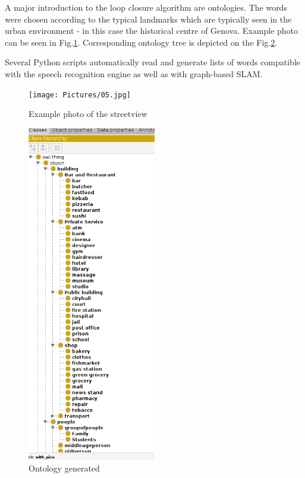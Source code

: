 \documentclass[conference]{IEEEtran}
\begin{document}
A major introduction to the loop closure algorithm are ontologies.
The words were chosen according to the typical landmarks which are typically seen in the urban environment - in this case the historical centre of Genova. Example photo can be seen in Fig.\ref{street view}. Corresponding ontology tree is depicted on the Fig.\ref{onto}.

Several Python scripts automatically read and generate lists of words compatible
with the speech recognition engine as well as with graph-based SLAM.
\begin{figure}[htbp]
    \centerline{\texttt{[image: Pictures/05.jpg]}}
    \caption{Example photo of the streetview}

    \label{street view}

\end{figure}



\begin{figure}[htbp]
    \centerline{\includegraphics[width=0.5\textwidth,height=0.2\textheight,keepaspectratio]{Pictures/onto.png}}
    \caption{Ontology generated}

    \label{onto}
\end{figure}
\end{document}
